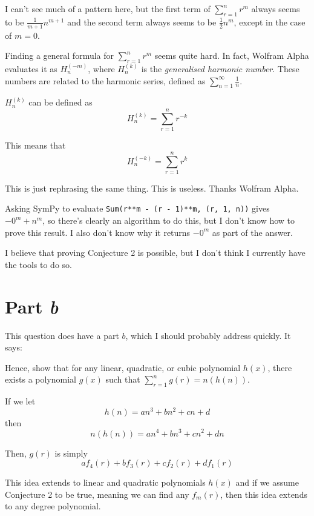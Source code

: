 \documentclass[a4paper]{article}
\newcommand{\sn}{\sum\limits_{r=1}^{n}}
\newcommand{\oo}[1]{\frac{1}{#1}}
\begin{document}
I can't see much of a pattern here, but the first term of $\sn r^m$ always seems to be $\oo{m+1}n^{m+1}$ and the second term always seems to be $\oo{2}n^{m}$, except in the case of $m = 0$.

Finding a general formula for $\sn r^m$ seems quite hard. In fact, Wolfram Alpha evaluates it as $H^{(-m)}_n$, where $H^{(k)}_n$ is the \textit{generalised harmonic number}. These numbers are related to the harmonic series, defined as $\sum\limits_{n=1}^\infty \oo{n}$.

$H^{(k)}_n$ can be defined as $$H^{(k)}_n = \sn r^{-k}$$

This means that $$H^{(-k)}_n = \sn r^k$$

This is just rephrasing the same thing. This is useless. Thanks Wolfram Alpha.

Asking SymPy to evaluate \texttt{Sum(r**m - (r - 1)**m, (r, 1, n))} gives $-0^m + n^m$, so there's clearly an algorithm to do this, but I don't know how to prove this result. I also don't know why it returns $-0^m$ as part of the answer.

I believe that proving Conjecture 2 is possible, but I don't think I currently have the tools to do so.

\section{Part \textit{b}}

This question does have a part $b$, which I should probably address quickly. It says:

Hence, show that for any linear, quadratic, or cubic polynomial $h(x)$, there exists a polynomial $g(x)$ such that $\sn g(r) = n(h(n))$.

If we let $$h(n) = an^3 + bn^2 + cn + d$$ then $$n(h(n)) = an^4 + bn^3 + cn^2 + dn$$

Then, $g(r)$ is simply $$af_4(r) + bf_3(r) + cf_2(r) + df_1(r)$$

This idea extends to linear and quadratic polynomials $h(x)$ and if we assume Conjecture 2 to be true, meaning we can find any $f_m(r)$, then this idea extends to any degree polynomial.
\end{document}
